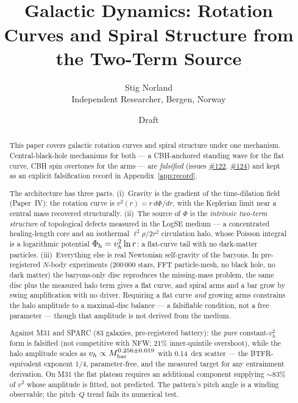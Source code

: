 \documentclass[11pt,a4paper]{article}
\title{\textbf{\seriesname~\papernumber}\\[0.4em]
\large Galactic Dynamics: Rotation Curves and Spiral Structure from the
Two-Term Source}
\author{Stig Norland\\
Independent Researcher, Bergen, Norway}
\date{Draft}
\providecommand{\ssvissue}[1]{\hyperref[issue:#1]{\##1}}
\begin{document}
\maketitle

\begin{abstract}
This paper covers galactic rotation curves and spiral structure under one
mechanism.  Central-black-hole mechanisms for both --- a CBH-anchored standing
wave for the flat curve, CBH spin overtones for the arms --- are
\emph{falsified} (issues \ssvissue{122}, \ssvissue{124}) and kept as an
explicit falsification record in Appendix~\ref{app:record}.

The architecture has three parts.  (i)~Gravity is the gradient of the
time-dilation field (Paper~IV): the rotation curve is $v^2(r)=r\,d\Phi/dr$,
with the Keplerian limit near a central mass recovered structurally.
(ii)~The source of $\Phi$ is the \emph{intrinsic two-term structure} of
topological defects measured in the LogSE medium --- a concentrated
healing-length core and an isothermal $\ell^2\rho/2r^2$ circulation halo, whose
Poisson integral is a logarithmic potential $\Phi_{\rm h}=v_h^2\ln r$: a
flat-curve tail with no dark-matter particles.  (iii)~Everything else is real
Newtonian self-gravity of the baryons.  In pre-registered $N$-body experiments
(200\,000 stars, FFT particle-mesh, no black hole, no dark matter) the
baryons-only disc reproduces the missing-mass problem, the same disc plus the
measured halo term gives a flat curve, and spiral arms and a bar grow by swing
amplification with no driver.  Requiring a flat curve \emph{and} growing arms
constrains the halo amplitude to a maximal-disc balance --- a falsifiable
condition, not a free parameter --- though that amplitude is not derived from
the medium.

Against M31 and SPARC (83 galaxies, pre-registered battery): the \emph{pure}
constant-$v_h^2$ form is falsified (not competitive with NFW; 21\%
inner-quintile overshoot), while the halo amplitude scales as
$v_h \propto M_{\rm bar}^{0.256\pm0.019}$ with 0.14~dex scatter --- the
BTFR-equivalent exponent $1/4$, parameter-free, and the measured target for any
entrainment derivation.  On M31 the flat plateau requires an additional
component supplying $\sim$83\% of $v^2$ whose amplitude is fitted, not
predicted.  The pattern's pitch angle is a winding observable; the pitch--$Q$
trend fails its numerical test.
\end{abstract}

\newpage
\tableofcontents
\newpage
\end{document}
